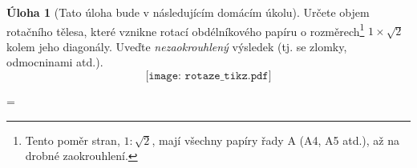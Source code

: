 \documentclass[10pt,a5paper]{extarticle}
\theoremstyle{definition}
\newtheorem{uloha}{Úloha}
\def\vysld{}
\let\printvysl\relax
\begin{document}
\begin{uloha}[Tato úloha bude v následujícím domácím úkolu]
Určete objem rotačního tělesa, které vznikne rotací obdélníkového papíru o rozměrech\footnote{Tento poměr stran, $1 : \sqrt2$, mají všechny papíry řady A (A4, A5 atd.), až na drobné zaokrouhlení.} $1 \times \sqrt2$ kolem jeho diagonály. Uveďte \emph{nezaokrouhlený} výsledek (tj. se zlomky, odmocninami atd.).
\[ \texttt{[image: rotaze\_tikz.pdf]} \]
\end{uloha}


\newpage
\parindent=0pt
\parskip=\smallskipamount
\def\printvysl#1#2{\textbf{#1.}\ #2\par}
\vysld
\end{document}
